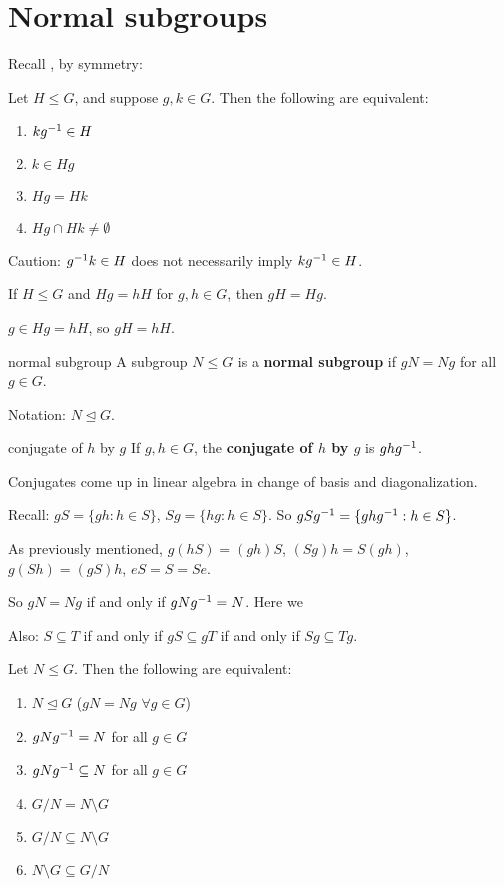 \section{Normal subgroups}
Recall , by symmetry:
\begin{prop}
	Let $H\le G$, and suppose $g,k\in G$. Then the following are equivalent:
	\begin{enumerate}[label=(\alph*)]
		\item $kg^{-1}\in H$
		\item $k\in Hg$
		\item $Hg=Hk$
		\item $Hg\cap Hk\ne \emptyset$
	\end{enumerate}
\end{prop}

Caution: $g^{-1} k \in H$ does not necessarily imply $kg^{-1} \in H$.

\begin{lemma}
	If $H\le G$ and $Hg=hH$ for $g,h\in G$, then $gH=Hg$.
\end{lemma}

\begin{pf}
	$g\in Hg=hH$, so $gH=hH$.
\end{pf}

\begin{defn}{normal subgroup}
	A subgroup $N\le G$ is a \textbf{normal subgroup} if $gN=Ng$ for all $g\in G$.

	Notation: $N \trianglelefteq  G$.
	
\end{defn}

\begin{defn}{conjugate of $h$ by $g$}
	If $g,h\in G$, the \textbf{conjugate of $h$ by $g$}
	is $ghg^{-1}$.
\end{defn}

Conjugates come up in linear algebra in change of basis and diagonalization. 

Recall: $gS=\{gh:h\in S\}$, $Sg=\{hg:h\in S\}$. So $gSg^{-1} =  \{ghg^{-1}:h\in S\}$.

As previously mentioned, $g(hS)=(gh)S$, $(Sg)h=S(gh)$, $g(Sh)=(gS)h$, $eS=S=Se$.

So $gN=Ng$ if and only if $gNg^{-1}=N$. Here we 

Also: $S\subseteq T$ if and only if $gS\subseteq gT$ if and only if $Sg\subseteq Tg$.

\begin{prop}
Let $N\le G$. Then the following are equivalent:
\begin{enumerate}[label=(\arabic*)]
\item $N\trianglelefteq G$ ($gN=Ng$ $\forall g\in G$)
\item $gNg^{-1} = N$ for all $g\in G$
\item $gNg^{-1} \subseteq N$ for all $g\in G$
\item $G/N=N\setminus G$
\item $G/N \subseteq N\setminus G$
\item $N\setminus G\subseteq G/N$
\end{enumerate}
\end{prop}

